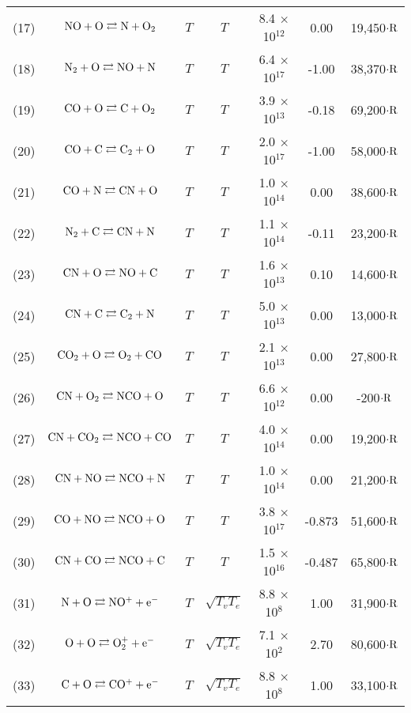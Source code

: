 \documentclass{warpdoc}
\begin{document}
\begin{table}[!h]
\begin{center}
\begin{threeparttable}
\begin{tabular}{ccccccc}
(17) & $\rm NO + O \rightleftarrows N + O_2 $ & $T$ & $T$ & 8.4 $\times$ 10$^{12}$  & 0.00 & 19,450$\cdot \rm R$ \\
(18) & $\rm N_2 + O \rightleftarrows NO + N $ & $T$ & $T$ & 6.4 $\times$ 10$^{17}$  & -1.00 & 38,370$\cdot \rm R$ \\
(19) & $\rm CO + O \rightleftarrows C + O_2 $ & $T$ & $T$ & 3.9 $\times$ 10$^{13}$  & -0.18 & 69,200$\cdot \rm R$ \\
(20) & $\rm CO + C \rightleftarrows C_2 + O $ & $T$ & $T$ & 2.0 $\times$ 10$^{17}$  & -1.00 & 58,000$\cdot \rm R$ \\
(21) & $\rm CO + N \rightleftarrows CN + O $ & $T$ & $T$ & 1.0 $\times$ 10$^{14}$  & 0.00 & 38,600$\cdot \rm R$ \\
(22) & $\rm N_2 + C \rightleftarrows CN + N $ & $T$ & $T$ & 1.1 $\times$ 10$^{14}$  & -0.11 & 23,200$\cdot \rm R$ \\
(23) & $\rm CN + O \rightleftarrows NO + C $ & $T$ & $T$ & 1.6 $\times$ 10$^{13}$  & 0.10 & 14,600$\cdot \rm R$ \\
(24) & $\rm CN + C \rightleftarrows C_2 + N $ & $T$ & $T$ & 5.0 $\times$ 10$^{13}$  & 0.00 & 13,000$\cdot \rm R$ \\
(25) & $\rm CO_2 + O \rightleftarrows O_2 + CO $ & $T$ & $T$ & 2.1 $\times$ 10$^{13}$  & 0.00 & 27,800$\cdot \rm R$ \\
(26) & $\rm CN + O_2 \rightleftarrows NCO + O $ & $T$ & $T$ & 6.6 $\times$ 10$^{12}$  & 0.00 & -200$\cdot \rm R$ \\
(27) & $\rm CN + CO_2 \rightleftarrows NCO + CO $ & $T$ & $T$ & 4.0 $\times$ 10$^{14}$  & 0.00 & 19,200$\cdot \rm R$ \\
(28) & $\rm CN + NO \rightleftarrows NCO + N $ & $T$ & $T$ & 1.0 $\times$ 10$^{14}$  & 0.00 & 21,200$\cdot \rm R$ \\
(29) & $\rm CO + NO \rightleftarrows NCO + O $ & $T$ & $T$ & 3.8 $\times$ 10$^{17}$  & -0.873 & 51,600$\cdot \rm R$ \\
(30) & $\rm CN + CO \rightleftarrows NCO + C $ & $T$ & $T$ & 1.5 $\times$ 10$^{16}$  & -0.487 & 65,800$\cdot \rm R$ \\



(31) & $\rm N + O \rightleftarrows NO^+ + e^- $ & $T$ & $\sqrt{T_{v}T_{e}}$ & 8.8 $\times$ 10$^{8}$  & 1.00 & 31,900$\cdot \rm R$ \\
(32) & $\rm O + O \rightleftarrows O^+_2 + e^- $ & $T$ & $\sqrt{T_{v}T_{e}}$ & 7.1 $\times$ 10$^{2}$  & 2.70 & 80,600$\cdot \rm R$ \\
(33) & $\rm C + O \rightleftarrows CO^+ + e^- $ & $T$ & $\sqrt{T_{v}T_{e}}$ & 8.8 $\times$ 10$^{8}$  & 1.00 & 33,100$\cdot \rm R$\\




\end{tabular}
\end{threeparttable}
\end{center}
\end{table}
\end{document}
